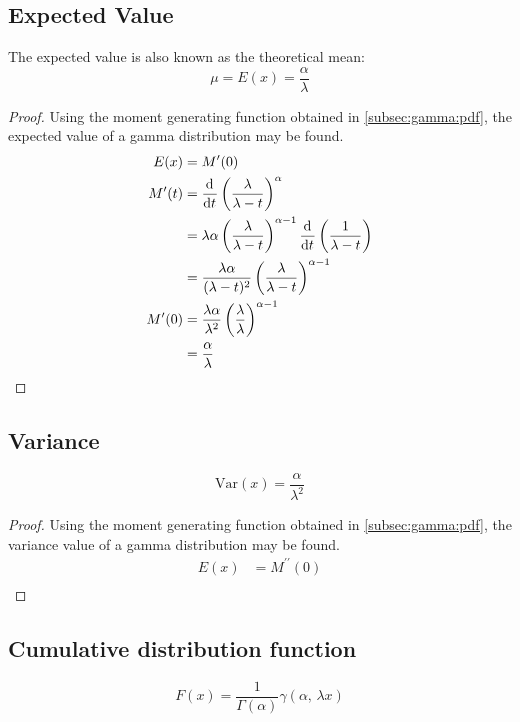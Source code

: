 \documentclass[12pt]{article}
\begin{document}
\subsection{Expected Value}
The expected value is also known as the theoretical mean:
\begin{equation}\label{eq:gamma-expected-value-2}
	\mu = E(x) = \frac{\alpha}{\lambda}
\end{equation}
\begin{proof}
	Using the moment generating function obtained in \autoref{subsec:gamma:pdf}, the expected value of a gamma
	distribution may be found.
	\begin{equation}
		\begin{split}
			E(x)		&=	M^\prime(0)\\
			M^\prime(t)	&=	\mathop{}\!\frac{\mathrm{d}^{}}{\mathrm{d}t^{}}\left(\frac{\lambda}{\lambda - t}\right)^\alpha\\
						&=	\lambda\alpha\left(\frac{\lambda}{\lambda - t}\right)^{\alpha-1}\mathop{}\!\frac{\mathrm{d}^{}}{\mathrm{d}t^{}}\left(\frac{1}{\lambda - t}\right)\\
						&=	\frac{\lambda\alpha}{(\lambda - t)^2}\left(\frac{\lambda}{\lambda - t}\right)^{\alpha-1}\\
			M^\prime(0)	&=	\frac{\lambda\alpha}{\lambda^2}\left(\frac{\lambda}{\lambda}\right)^{\alpha-1}\\
						&=	\frac{\alpha}{\lambda}\\
		\end{split}
	\end{equation}
\end{proof}

\subsection{Variance}
\begin{equation}\label{eq:gamma-variance-2}
	\text{Var}(x) = \frac{\alpha}{\lambda^2}
\end{equation}
\begin{proof}
	Using the moment generating function obtained in \autoref{subsec:gamma:pdf}, the variance value of a gamma
	distribution may be found.
	\begin{equation}
		\begin{split}
			E(x)	&=	M^{\prime\prime}(0)\\
		\end{split}
	\end{equation}
\end{proof}

\subsection{Cumulative distribution function }\label{subsec:gamma:cdf}
\begin{equation}\label{eq:gamma-cdf-2}
	F(x) = \frac{1}{\Gamma(\alpha)}\gamma(\alpha,\, \lambda x)
\end{equation}
\end{document}
